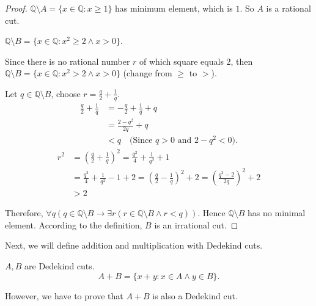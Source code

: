 \documentclass[class=mike-apostol-mathematical-analysis,crop=false]{standalone}
\begin{document}
\begin{proof}
    \par $\mathbb{Q}\setminus A = \{ x\in\mathbb{Q}: x\ge 1 \}$ has minimum element, which is $1$. So $ A$ is a rational cut.
    \bigskip
    \par $\mathbb{Q}\setminus B = \{ x\in\mathbb{Q}: {x}^{2}\ge 2 \wedge x > 0 \}$.
    \par Since there is no rational number $r$ of which square equals $2$, then $\mathbb{Q}\setminus B = \{ x\in\mathbb{Q}: {x}^{2} > 2 \wedge x > 0 \}$ (change from $\ge$ to $>$).
    \par Let $q\in\mathbb{Q}\setminus B$, choose $r = \frac{q}{2} + \frac{1}{q}$.
    \begin{align*}
        \frac{q}{2} + \frac{1}{q} & = -\frac{q}{2} + \frac{1}{q} + q                       \\
                                  & = \frac{2 - {q}^{2}}{2q} + q                           \\
                                  & < q \quad\text{(Since $q > 0$ and $2 - {q}^{2} < 0$)}.
    \end{align*}
    \begin{align*}
        {r}^{2} & = {\left(\frac{q}{2} + \frac{1}{q}\right)}^{2} = \frac{q^{2}}{4} + \frac{1}{q^{2}} + 1                                                         \\
                & = \frac{q^{2}}{4} + \frac{1}{q^{2}} - 1 + 2 = {\left(\frac{q}{2} - \frac{1}{q}\right)}^{2} + 2 = {\left( \frac{q^{2} - 2}{2q} \right)}^{2} + 2 \\
                & > 2
    \end{align*}
    \par Therefore, $\forall q(q\in\mathbb{Q}\setminus B \rightarrow \exists r( r\in\mathbb{Q}\setminus B \wedge r < q ))$. Hence $\mathbb{Q}\setminus B$ has no minimal element. According to the definition, $ B$ is an irrational cut.
\end{proof}

\par Next, we will define addition and multiplication with Dedekind cuts.

\begin{definition}[Addition]
    \par $ A,  B$ are Dedekind cuts.
    \[
        A +  B = \{ x + y : x\in A \wedge y\in B \}.
    \]
\end{definition}

\par However, we have to prove that $ A +  B$ is also a Dedekind cut.
\end{document}
